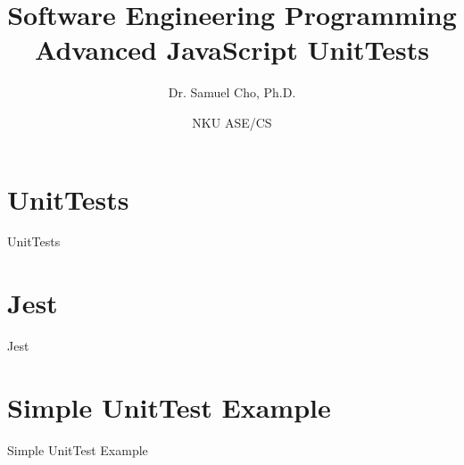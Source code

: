 \documentclass[handout, 14pt]{beamer}
\begin{document}
\title[SE Tools 1]{Software Engineering Programming\\Advanced JavaScript UnitTests}
\author{Dr. Samuel Cho, Ph.D.} 
\date{NKU ASE/CS} 

\frame{\titlepage} 

\begin{frame}[fragile]{}
\begin{center} 
    \tableofcontents
\end{center}
\end{frame}

\def\title{UnitTests}
\section[unittest]{\title}
\begin{frame}[fragile]{}%
\begin{center}%
%
%
\title
\end{center}%
\end{frame}
 

\def\title{Jest}
\section[jest]{\title}
\begin{frame}[fragile]{}%
\begin{center}%
%
%
\title
\end{center}%
\end{frame}
  

\def\title{Simple UnitTest Example}
\section[example]{\title}
\begin{frame}[fragile]{}%
\begin{center}%
%
%
\title
\end{center}%
\end{frame}
 
\end{document}
